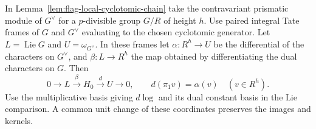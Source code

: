 \begin{auxlemma}\label{lem:flag-local-hodge-quotients}
In Lemma~\ref{lem:flag-local-cyclotomic-chain} take the contravariant prismatic module of \(G^\vee\) for a \(p\)-divisible group \(G/R\) of height \(h\). Use paired integral Tate frames of \(G\) and \(G^\vee\) evaluating to the chosen cyclotomic generator. Let \(L=\operatorname{Lie}G\) and \(U=\omega_{G^\vee}\). In these frames let \(\alpha:R^h\to U\) be the differential of the characters on \(G^\vee\), and \(\beta:L\to R^h\) the map obtained by differentiating the dual characters on \(G\). Then
\[
 0\longrightarrow L\xrightarrow{\ \beta\ } H_0
          \xrightarrow{\ d\ } U\longrightarrow0,\qquad
 d(\pi_1 v)=\alpha(v)\quad(v\in R^h).
\]
Use the multiplicative basis giving \(d\log\) and its dual constant basis in the Lie comparison. A common unit change of these coordinates preserves the images and kernels.
\end{auxlemma}
